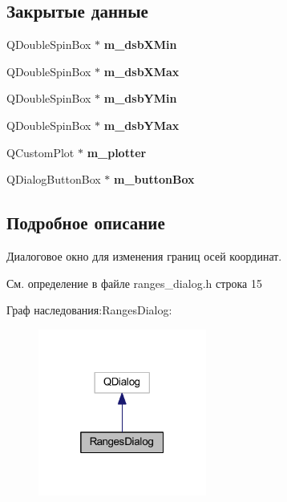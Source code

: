 \subsection*{Закрытые данные}
\begin{DoxyCompactItemize}
\item 
\hypertarget{class_ranges_dialog_aa7e90336b7f703eda2d04b74cc29b1f1}{}\label{class_ranges_dialog_aa7e90336b7f703eda2d04b74cc29b1f1} 
Q\+Double\+Spin\+Box $\ast$ {\bfseries m\+\_\+dsb\+X\+Min}
\item 
\hypertarget{class_ranges_dialog_a336a353a6730dc45cbac777808b6c368}{}\label{class_ranges_dialog_a336a353a6730dc45cbac777808b6c368} 
Q\+Double\+Spin\+Box $\ast$ {\bfseries m\+\_\+dsb\+X\+Max}
\item 
\hypertarget{class_ranges_dialog_a5ca6eae82b600f510d7e0e45bd0c254a}{}\label{class_ranges_dialog_a5ca6eae82b600f510d7e0e45bd0c254a} 
Q\+Double\+Spin\+Box $\ast$ {\bfseries m\+\_\+dsb\+Y\+Min}
\item 
\hypertarget{class_ranges_dialog_a2b993d1980494d1dcd45a9f432c04c39}{}\label{class_ranges_dialog_a2b993d1980494d1dcd45a9f432c04c39} 
Q\+Double\+Spin\+Box $\ast$ {\bfseries m\+\_\+dsb\+Y\+Max}
\item 
\hypertarget{class_ranges_dialog_a68fd573fcf8e4c35716edca9b983ee16}{}\label{class_ranges_dialog_a68fd573fcf8e4c35716edca9b983ee16} 
Q\+Custom\+Plot $\ast$ {\bfseries m\+\_\+plotter}
\item 
\hypertarget{class_ranges_dialog_abd076dcdfac169f18d61b361478fa523}{}\label{class_ranges_dialog_abd076dcdfac169f18d61b361478fa523} 
Q\+Dialog\+Button\+Box $\ast$ {\bfseries m\+\_\+button\+Box}
\end{DoxyCompactItemize}


\subsection{Подробное описание}
Диалоговое окно для изменения границ осей координат. 

См. определение в файле ranges\+\_\+dialog.\+h строка 15



Граф наследования\+:Ranges\+Dialog\+:
\nopagebreak
\begin{figure}[H]
\begin{center}
\leavevmode
\includegraphics[width=157pt]{class_ranges_dialog__inherit__graph}
\end{center}
\end{figure}


